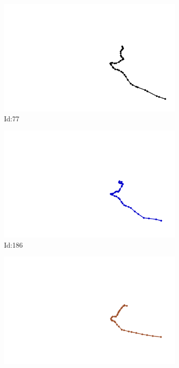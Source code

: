 \documentclass[12pt,twoside]{report}
\begin{document}
\begin{figure}
\centering
\begin{subfigure}[b]{0.20\textwidth}
\centering
\includegraphics[width=\textwidth]{../../trajectories/77.png}
\caption{Id:77}
\end{subfigure}
\begin{subfigure}[b]{0.20\textwidth}
\centering
\includegraphics[width=\textwidth]{../../trajectories/186.png}
\caption{Id:186}
\end{subfigure}
\begin{subfigure}[b]{0.20\textwidth}
\centering
\includegraphics[width=\textwidth]{../../trajectories/310.png}

\end{subfigure}
\end{figure}
\end{document}

